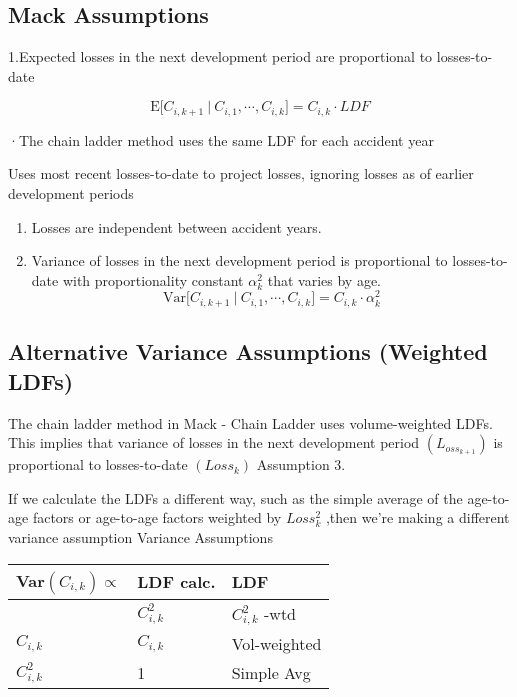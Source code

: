 \documentclass[
]{article}
\begin{document}
\subsection{Mack Assumptions}\label{mack-assumptions}

1.Expected losses in the next development period are proportional to
losses-to-date

\[\mathrm{E}\Big[C_{i,k+1}\:|\:C_{i,1},\cdots,C_{i,k}\Big]=C_{i,k}\cdot LDF\]

·The chain ladder method uses the same LDF for each accident year

Uses most recent losses-to-date to project losses, ignoring losses as of
earlier development periods

\begin{enumerate}
\def\labelenumi{\arabic{enumi}.}
\setcounter{enumi}{1}
\item
  Losses are independent between accident years.
\item
  Variance of losses in the next development period is proportional to
  losses-to-date with proportionality constant \(\alpha_{k}^{2}\) that
  varies by age.
  \[\mathrm{Var}\Big[C_{i,k+1}\:|\:C_{i,1},\cdots,C_{i,k}\Big]=C_{i,k}\cdot\alpha_{k}^{2}\]
\end{enumerate}

\subsection{Alternative Variance Assumptions (Weighted
LDFs)}\label{alternative-variance-assumptions-weighted-ldfs}

The chain ladder method in Mack - Chain Ladder uses volume-weighted
LDFs. This implies that variance of losses in the next development
period \((L_{oss_{k+1}})\) is proportional to losses-to-date
\((Loss_{k})\) Assumption 3.

If we calculate the LDFs a different way, such as the simple average of
the age-to-age factors or age-to-age factors weighted by \(Loss_k^2\)
,then we're making a different variance assumption Variance Assumptions

\begin{longtable}[]{@{}lll@{}}
\toprule\noalign{}
Var\((C_{i,k}) \propto\) & LDF calc. & LDF \\
\midrule\noalign{}
\endhead
\bottomrule\noalign{}
\endlastfoot
1 & \(C^2_{i,k}\) & \(C^2_{i,k}\) -wtd \\
\(C_{i,k}\) & \(C_{i,k}\) & Vol-weighted \\
\(C^2_{i,k}\) & 1 & Simple Avg \\
\end{longtable}
\end{document}
